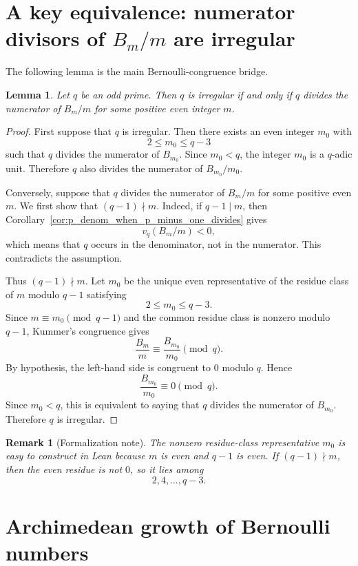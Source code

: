 \documentclass[11pt]{article}
\newtheorem{lemma}[theorem]{Lemma}
\newtheorem{remark}[theorem]{Remark}
\begin{document}
\section{A key equivalence: numerator divisors of $B_m/m$ are irregular}

The following lemma is the main Bernoulli-congruence bridge.

\begin{lemma}\label{lem:prime_divisor_divided_Bernoulli_irregular}
Let $q$ be an odd prime.  Then $q$ is irregular if and only if $q$ divides the numerator of $B_m/m$ for some positive even integer $m$.
\end{lemma}

\begin{proof}
First suppose that $q$ is irregular.  Then there exists an even integer $m_0$ with
\[
  2\le m_0\le q-3
\]
such that $q$ divides the numerator of $B_{m_0}$.  Since $m_0<q$, the integer $m_0$ is a $q$-adic unit.  Therefore $q$ also divides the numerator of $B_{m_0}/m_0$.

Conversely, suppose that $q$ divides the numerator of $B_m/m$ for some positive even $m$.  We first show that $(q-1)\nmid m$.  Indeed, if $q-1\mid m$, then Corollary~\ref{cor:p_denom_when_p_minus_one_divides} gives
\[
  v_q(B_m/m)<0,
\]
which means that $q$ occurs in the denominator, not in the numerator.  This contradicts the assumption.

Thus $(q-1)\nmid m$.  Let $m_0$ be the unique even representative of the residue class of $m$ modulo $q-1$ satisfying
\[
  2\le m_0\le q-3.
\]
Since $m\equiv m_0\pmod{q-1}$ and the common residue class is nonzero modulo $q-1$, Kummer's congruence gives
\[
  \frac{B_m}{m}\equiv \frac{B_{m_0}}{m_0}\pmod q.
\]
By hypothesis, the left-hand side is congruent to $0$ modulo $q$.  Hence
\[
  \frac{B_{m_0}}{m_0}\equiv 0\pmod q.
\]
Since $m_0<q$, this is equivalent to saying that $q$ divides the numerator of $B_{m_0}$.  Therefore $q$ is irregular.
\end{proof}

\begin{remark}[Formalization note]
The nonzero residue-class representative $m_0$ is easy to construct in Lean because $m$ is even and $q-1$ is even.  If $(q-1)\nmid m$, then the even residue is not $0$, so it lies among
\[
  2,4,\dots,q-3.
\]
\end{remark}

\section{Archimedean growth of Bernoulli numbers}
\end{document}
